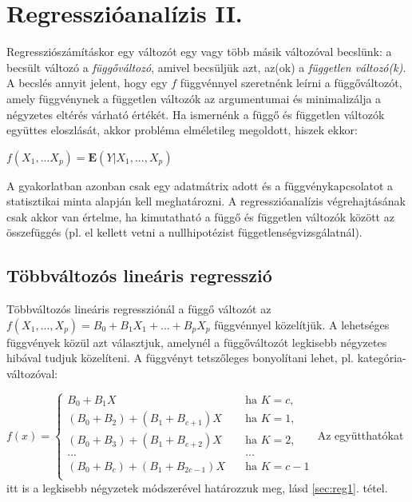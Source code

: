 \chapter{Regresszióanalízis II.}

Regressziószámításkor egy változót egy vagy több másik változóval becslünk: a becsült változó a \emph{függőváltozó}, amivel becsüljük azt, az(ok) a \emph{független változó(k)}. A becslés annyit jelent, hogy egy $f$ függvénnyel szeretnénk leírni a függőváltozót, amely függvénynek a független változók az argumentumai és minimalizálja a négyzetes eltérés várható értékét. Ha ismernénk a függő és független változók együttes eloszlását, akkor probléma elméletileg megoldott, hiszek ekkor:

$f(X_1,...X_p) = \mathbf{E}(Y| X_1, ..., X_p)$

A gyakorlatban azonban csak egy adatmátrix adott és a függvénykapcsolatot a statisztikai minta alapján kell meghatározni. A regresszióanalízis végrehajtásának csak akkor van értelme, ha kimutatható a függő és független változók között az összefüggés (pl. el kellett vetni a nullhipotézist függetlenségvizsgálatnál).

\section{Többváltozós lineáris regresszió}

Többváltozós lineáris regressziónál a függő változót az $f(X_1, ...,X_p)= B_0 + B_1X_1 + ... + B_pX_p$ függvénnyel közelítjük. A lehetséges függvények közül azt választjuk, amelynél a függőváltozót legkisebb négyzetes hibával tudjuk közelíteni. A függvényt tetszőleges bonyolítani lehet, pl. kategória-változóval:

$f(x) = 
  \begin{cases}
    B_0 + B_1X       & \quad \text{ha } K=c, \\
    (B_0 + B_2) + (B_1+ B_{c+1})X  & \quad \text{ha } K =1,\\
    (B_0 + B_3) + (B_1+ B_{c+2})X  & \quad \text{ha } K =2,\\
    ... & \quad ...\\
    (B_0 + B_c) + (B_1+ B_{2c-1})X  & \quad \text{ha } K =c-1\\
  \end{cases}
$
Az együtthatókat itt is a legkisebb négyzetek módszerével határozzuk meg, lásd \ref{sec:reg1}. tétel.


